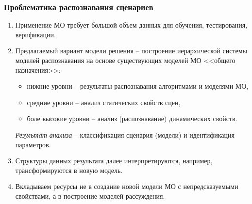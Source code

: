 \documentclass[10pt]{beamer}
\begin{document}
\begin{frame}
  \frametitle{Проблематика распознавания сценариев}
  \begin{enumerate}
  \item Применение МО требует большой объем данных для обучения, тестирования, верификации.
  \item Предлагаемый вариант модели решения -- построение иерархической системы моделей распознавания на основе существующих моделей МО <<общего назначения>>:
    \begin{itemize}
    \item нижние уровни -- результаты распознавания алгоритмами и моделями МО,
    \item средние уровни -- анализ статических свойств сцен,
    \item боле высокие уровни -- анализ (распознавание) динамических свойств.
    \end{itemize}
    \emph{Результат анализа} -- классификация сценария (модели) и идентификация параметров.


  \item Структуры данных результата далее интерпретируются, например, трансформируются в новую модель.
  \item Вкладываем ресурсы не в создание новой модели МО с непредсказуемыми свойствами, а в построение моделей рассуждения.
    \end{enumerate}
\end{frame}
\end{document}
